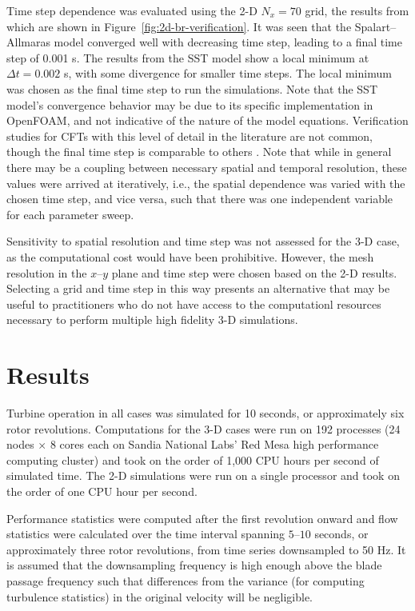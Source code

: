 \documentclass[aip,graphicx]{revtex4-1}
\begin{document}
Time step dependence was evaluated using the 2-D $N_x=70$ grid, the results from
which are shown in Figure~\ref{fig:2d-br-verification}. It was seen that the
Spalart--Allmaras model converged well with decreasing time step, leading to a
final time step of 0.001 s. The results from the SST model show a local minimum
at $\Delta t = 0.002$ s, with some divergence for smaller time steps. The local
minimum was chosen as the final time step to run the simulations. Note that the
SST model's convergence behavior may be due to its specific implementation in
OpenFOAM, and not indicative of the nature of the model equations. Verification
studies for CFTs with this level of detail in the literature are not common,
though the final time step is comparable to others \cite{Balduzzi2016}. Note
that while in general there may be a coupling between necessary spatial and
temporal resolution, these values were arrived at iteratively, i.e., the spatial
dependence was varied with the chosen time step, and vice versa, such that there
was one independent variable for each parameter sweep.

Sensitivity to spatial resolution and time step was not assessed for the 3-D
case, as the computational cost would have been prohibitive. However, the mesh
resolution in the $x$--$y$ plane and time step were chosen based on the 2-D
results. Selecting a grid and time step in this way presents an alternative that
may be useful to practitioners who do not have access to the computationl
resources necessary to perform multiple high fidelity 3-D simulations.


\section{Results}

Turbine operation in all cases was simulated for 10 seconds, or approximately
six rotor revolutions. Computations for the 3-D cases were run on 192 processes
(24 nodes $\times$ 8 cores each on Sandia National Labs' Red Mesa high
performance computing cluster) and took on the order of 1,000 CPU hours per
second of simulated time. The 2-D simulations were run on a single processor and
took on the order of one CPU hour per second.

Performance statistics were computed after the first revolution onward and flow
statistics were calculated over the time interval spanning $5$--$10$ seconds, or
approximately three rotor revolutions, from time series downsampled to 50 Hz. It
is assumed that the downsampling frequency is high enough above the blade
passage frequency such that differences from the variance (for computing
turbulence statistics) in the original velocity will be negligible.
\end{document}
